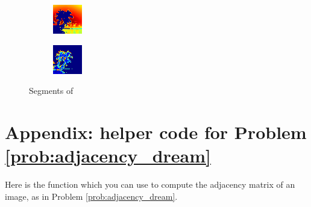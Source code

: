 \begin{figure}
\begin{subfigure}{0.31\textwidth}
        \includegraphics[width=\textwidth]{NegDream.png}
    \end{subfigure}
    \hspace*{\fill}
    \begin{subfigure}{0.31\textwidth}
        \includegraphics[width=\textwidth]{PosDream.png}
    \end{subfigure}
\caption{Segments of }
\label{fig:dream_solution}
\end{figure}

\section*{Appendix: helper code for Problem \ref{prob:adjacency_dream}}
Here is the function  which you can use to compute the adjacency matrix of an image, as in Problem \ref{prob:adjacency_dream}.

